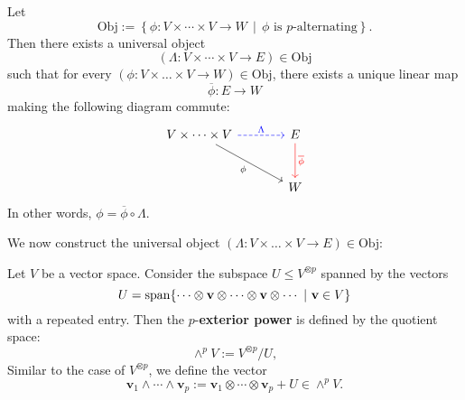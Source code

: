 \begin{theorem}\label{thm:univ-exterior}
Let 
\[ \mathrm{Obj} := \left\{ \phi : V \times \cdots \times V \to W \,\middle|\, \phi \text{ is $p$-alternating} \right\} .\] 
Then there exists a universal object
\[
(\Lambda : V \times \cdots \times V \longrightarrow E) \in \mathrm{Obj}
\]
such that for every \( (\phi: V \times \dots \times V \to W) \in \mathrm{Obj} \), there exists a unique linear map
\[
\overline{\phi} : E \longrightarrow W
\]
making the following diagram commute:
\[
\begin{tikzcd}[row sep=large, column sep=large]
  V \times \cdots \times V 
    \arrow[r, "\Lambda", dashed, blue] 
    \arrow[dr, "\phi"'] 
    & E 
    \arrow[d, "\overline{\phi}", red] \\
   & W 
\end{tikzcd}
\]
In other words, \(\phi = \overline{\phi} \circ \Lambda.
\)
\end{theorem}

We now construct the universal object $(\Lambda: V \times \dots \times V \to E) \in \mathrm{Obj}$:
\begin{definition}\label{def:wedgeproduct}
Let $V$ be a vector space. Consider the subspace $U \leq V^{\otimes p}$ spanned by the vectors
$$U = \mathrm{span}\{ \cdots \otimes {\bf v} \otimes \cdots \otimes {\bf v} \otimes \cdots\ |\ {\bf v} \in V\}$$
with a repeated entry. Then the $p$-\textbf{exterior power} is defined by the quotient space:
\[
\wedge^p V := V^{\otimes p} / U,
\]
Similar to the case of $V^{\otimes p}$, we define the vector
\[
\mathbf{v}_1 \wedge \cdots \wedge \mathbf{v}_p := \mathbf{v}_1 \otimes \cdots \otimes \mathbf{v}_p + U \in \wedge^p V.
\]
\end{definition}

